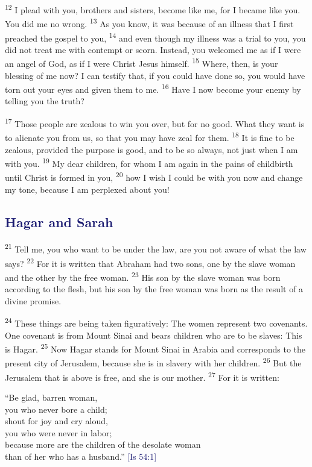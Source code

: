 \documentclass[12pt,twoside]{article}
\newcommand{\vs}[1]{\textsuperscript{#1}}
\begin{document}
 \vs{12} I plead with you, brothers and sisters, become like me, for I became like you. You did me no wrong.
 \vs{13} As you know, it was because of an illness that I first preached the gospel to you,
 \vs{14} and even though my illness was a trial to you, you did not treat me with contempt or scorn. Instead, you welcomed me as if I were an angel of God, as if I were Christ Jesus himself.
 \vs{15} Where, then, is your blessing of me now? I can testify that, if you could have done so, you would have torn out your eyes and given them to me.
 \vs{16} Have I now become your enemy by telling you the truth?

 \vs{17} Those people are zealous to win you over, but for no good. What they want is to alienate you from us, so that you may have zeal for them.
 \vs{18} It is fine to be zealous, provided the purpose is good, and to be so always, not just when I am with you.
 \vs{19} My dear children, for whom I am again in the pains of childbirth until Christ is formed in you,
 \vs{20} how I wish I could be with you now and change my tone, because I am perplexed about you!

 \subsection*{\textcolor{MidnightBlue}{\textbf{Hagar and Sarah}}}

 \hspace{0.5cm} \vs{21} Tell me, you who want to be under the law, are you not aware of what the law says?
 \vs{22} For it is written that Abraham had two sons, one by the slave woman and the other by the free woman.
 \vs{23} His son by the slave woman was born according to the flesh, but his son by the free woman was born as the result of a divine promise.

 \vs{24} These things are being taken figuratively: The women represent two covenants. One covenant is from Mount Sinai and bears children who are to be slaves: This is Hagar.
 \vs{25} Now Hagar stands for Mount Sinai in Arabia and corresponds to the present city of Jerusalem, because she is in slavery with her children.
 \vs{26} But the Jerusalem that is above is free, and she is our mother.
 \vs{27} For it is written:

\begin{minipage}{10cm}
    \noindent ``Be glad, barren woman,\\
    you who never bore a child;\\
    shout for joy and cry aloud,\\
    you who were never in labor;\\
    because more are the children of the desolate woman\\
    than of her who has a husband.'' {\fontsize{8pt}{5pt}\selectfont\textcolor{MidnightBlue}{[Is 54:1]}}\\
 \end{minipage}
\end{document}
